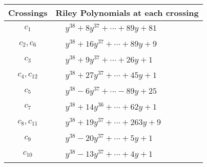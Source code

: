 \documentclass[1p]{elsarticle_modified}
\theoremstyle{definition}
\begin{document}
\begin{tabular}{m{50pt}|m{274pt}}
Crossings & \hspace{64pt}Riley Polynomials at each crossing \\
\hline $$\begin{aligned}c_{1}\end{aligned}$$&$\begin{aligned}
&y^{38}+8 y^{37}+\cdots+89 y+81
\end{aligned}$\\
\hline $$\begin{aligned}c_{2},c_{6}\end{aligned}$$&$\begin{aligned}
&y^{38}+16 y^{37}+\cdots+89 y+9
\end{aligned}$\\
\hline $$\begin{aligned}c_{3}\end{aligned}$$&$\begin{aligned}
&y^{38}+9 y^{37}+\cdots+26 y+1
\end{aligned}$\\
\hline $$\begin{aligned}c_{4},c_{12}\end{aligned}$$&$\begin{aligned}
&y^{38}+27 y^{37}+\cdots+45 y+1
\end{aligned}$\\
\hline $$\begin{aligned}c_{5}\end{aligned}$$&$\begin{aligned}
&y^{38}-6 y^{37}+\cdots-89 y+25
\end{aligned}$\\
\hline $$\begin{aligned}c_{7}\end{aligned}$$&$\begin{aligned}
&y^{38}+14 y^{36}+\cdots+62 y+1
\end{aligned}$\\
\hline $$\begin{aligned}c_{8},c_{11}\end{aligned}$$&$\begin{aligned}
&y^{38}+19 y^{37}+\cdots+263 y+9
\end{aligned}$\\
\hline $$\begin{aligned}c_{9}\end{aligned}$$&$\begin{aligned}
&y^{38}-20 y^{37}+\cdots+5 y+1
\end{aligned}$\\
\hline $$\begin{aligned}c_{10}\end{aligned}$$&$\begin{aligned}
&y^{38}-13 y^{37}+\cdots+4 y+1
\end{aligned}$\\
\hline
\end{tabular}\\~\\
\end{document}
